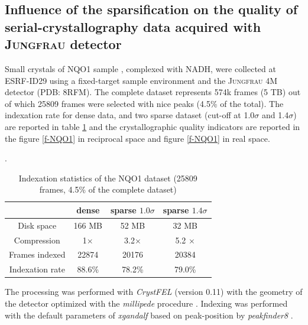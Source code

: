 \documentclass[preprint]{iucr}              %
\begin{document}
\subsection{Influence of the sparsification on the quality of serial-crystallography data acquired with \textsc{Jungfrau} detector}
Small crystals of NQO1 sample \cite{NQO1}, complexed with NADH, were collected at ESRF-ID29 using a fixed-target sample environment and the \textsc{Jungfrau} 4M detector (PDB: 8RFM). 
The complete dataset represents 574k frames (5 TB) out of which 25809 frames were selected with nice peaks (4.5\% of the total).
The indexation rate for dense data, and two sparse dataset (cut-off at 1.0$\sigma$ and 1.4$\sigma$) are reported in table \ref{t-NQO1} and the crystallographic quality indicators are reported in the figure \ref{f-NQO1} in reciprocal space and figure \ref{f-NQO1} in real space. 

\begin{table}
\label{t-NQO1}
\begin{center}
\caption{Indexation statistics of the NQO1 dataset (25809 frames, 4.5\% of the complete dataset)}.
\begin{tabular}{|c|c | c | c |} 
\hline
       & dense & sparse $1.0\sigma$ & sparse $1.4\sigma$ \\ 
\hline
Disk space & 166 MB & 52 MB & 32 MB \\
Compression & 1$\times$ & 3.2$\times$ & 5.2 $\times$ \\
Frames indexed  & 22874 & 20176 & 20384 \\
Indexation rate & 88.6\%& 78.2\% & 79.0\%\\
\hline
\end{tabular}
\end{center}
\end{table}

The processing was performed with \textit{CrystFEL} \cite{CrystFEL} (version 0.11) with the geometry of the detector optimized with the \textit{millipede} procedure \cite{millepede, millepede2}. 
Indexing was performed with the default parameters of \textit{xgandalf} \cite{xgandalf} based on peak-position by \textit{peakfinder8} \cite{Cheetah2014}.
\end{document}
